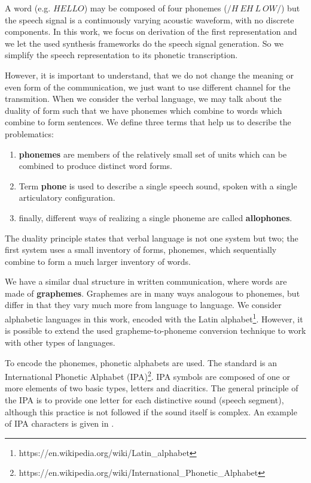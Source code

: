A word (e.g. $HELLO$) may be composed of four phonemes ($/H\:EH\:L\:OW/$) but the speech signal is a continuously varying acoustic waveform, with no discrete components.
In this work, we focus on derivation of the first representation and we let the used synthesis frameworks do the speech signal generation.
So we simplify the speech representation to its phonetic transcription.
\par
However, it is important to understand, that we do not change the meaning or even form of the communication, we just want to use different channel for the transmition.
When we consider the verbal language, we may talk about the duality of form such that we have phonemes which combine to words which combine to form sentences.
We define three terms that help us to describe the problematics:
\begin{enumerate}
\item \textbf{phonemes} are members of the relatively small set of units which can be combined to produce distinct word forms.
\item Term \textbf{phone} is used to describe a single speech sound, spoken with a single articulatory configuration.
\item finally, different ways of realizing a single phoneme are called \textbf{allophones}.
\end{enumerate}
The duality principle states that verbal language is not one system but two; the first system uses a
small inventory of forms, phonemes, which sequentially combine to form a much larger inventory
of words.
\par
We have a similar dual structure in written communication, where words are made of \textbf{graphemes}.
Graphemes are in many ways analogous to phonemes, but differ in that they vary much more from language to language.
We consider alphabetic languages in this work, encoded with the Latin alphabet\footnote{https://en.wikipedia.org/wiki/Latin\_alphabet}.
However, it is possible to extend the used grapheme-to-phoneme conversion technique \cite{bisani2008joint} to work with other types of languages.
\par
To encode the phonemes, phonetic alphabets are used.
The standard is an International Phonetic Alphabet (IPA)\footnote{https://en.wikipedia.org/wiki/International\_Phonetic\_Alphabet}.
IPA symbols are composed of one or more elements of two basic types, letters and diacritics.
The general principle of the IPA is to provide one letter for each distinctive sound (speech segment), although this practice is not followed if the sound itself is complex.
An example of IPA characters is given in .
